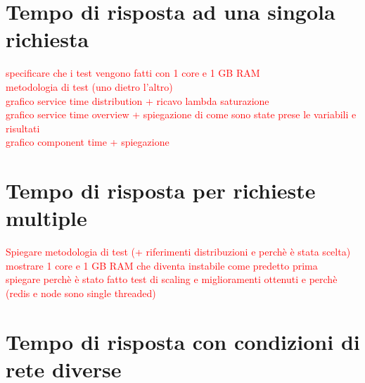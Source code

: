 \section{Tempo di risposta ad una singola richiesta}

\textcolor{red}{specificare che i test vengono fatti con 1 core e 1 GB RAM\\
	metodologia di test (uno dietro l'altro)\\
	grafico service time distribution + ricavo lambda saturazione\\
	grafico service time overview + spiegazione di come sono state prese le variabili e risultati\\
	grafico component time + spiegazione}

\section{Tempo di risposta per richieste multiple}

\textcolor{red}{Spiegare metodologia di test (+ riferimenti distribuzioni e perchè è stata scelta)\\
	mostrare 1 core e 1 GB RAM che diventa instabile come predetto prima\\
	spiegare perchè è stato fatto test di scaling e miglioramenti ottenuti e perchè (redis e node sono single threaded)}

\section{Tempo di risposta con condizioni di rete diverse}

